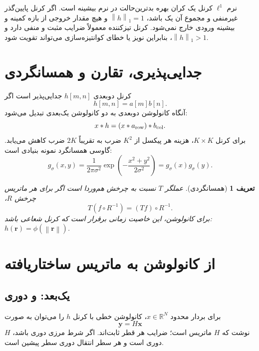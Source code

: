 \documentclass[12pt,openany,oneside]{book}
\newtheorem{definition}{تعریف}[chapter]
\newcommand{\R}{\mathbb{R}}
\newcommand{\norm}[1]{\left\lVert #1\right\rVert}
\newcommand{\vect}[1]{\bm{#1}}
\begin{document}
\begin{keybox}
نرم \(\ell^1\) کرنل یک کران بهره بدترین‌حالت در نرم بیشینه است. اگر کرنل پایین‌گذر غیرمنفی و مجموع آن یک
باشد، \(\norm h_1=1\) و هیچ مقدار خروجی از بازه کمینه و بیشینه ورودی خارج نمی‌شود. کرنل تیزکننده معمولاً
ضرایب مثبت و منفی دارد و \(\norm h_1>1\)، بنابراین نویز یا خطای کوانتیزه‌سازی می‌تواند تقویت شود.
\end{keybox}

\section{جدایی‌پذیری، تقارن و همسانگردی}

کرنل دوبعدی \(h[m,n]\) جدایی‌پذیر است اگر
\begin{equation}
h[m,n]=a[m]b[n].
\end{equation}
آنگاه کانولوشن دوبعدی به دو کانولوشن یک‌بعدی تبدیل می‌شود:
\begin{equation}
x*h=(x*a_{\rm row})*b_{\rm col}.
\end{equation}
برای کرنل \(K\times K\)، هزینه هر پیکسل از \(K^2\) ضرب به تقریباً \(2K\) ضرب کاهش می‌یابد.
گاوسی همسانگرد نمونه بنیادی است:
\begin{equation}
g_\sigma(x,y)=\frac{1}{2\pi\sigma^2}
\exp\left(-\frac{x^2+y^2}{2\sigma^2}\right)
=g_\sigma(x)g_\sigma(y).
\end{equation}

\begin{definition}[همسانگردی]
عملگر \(T\) نسبت به چرخش هم‌وردا است اگر برای هر ماتریس چرخش \(R\)،
\begin{equation}
T(f\circ R^{-1})=(Tf)\circ R^{-1}.
\end{equation}
برای کانولوشن، این خاصیت زمانی برقرار است که کرنل شعاعی باشد: \(h(\vect r)=\phi(\norm{\vect r})\).
\end{definition}

\section{از کانولوشن به ماتریس ساختاریافته}

\subsection{یک‌بعد:  و دوری}
برای بردار محدود \(x\in\R^N\)، کانولوشن خطی با کرنل \(h\) را می‌توان به صورت
\begin{equation}
\vect y=H\vect x
\end{equation}
نوشت که \(H\) ماتریس  است؛ ضرایب هر قطر ثابت‌اند. اگر شرط مرزی دوری باشد، \(H\) دوری
 است و هر سطر انتقال دوری سطر پیشین است.
\end{document}
